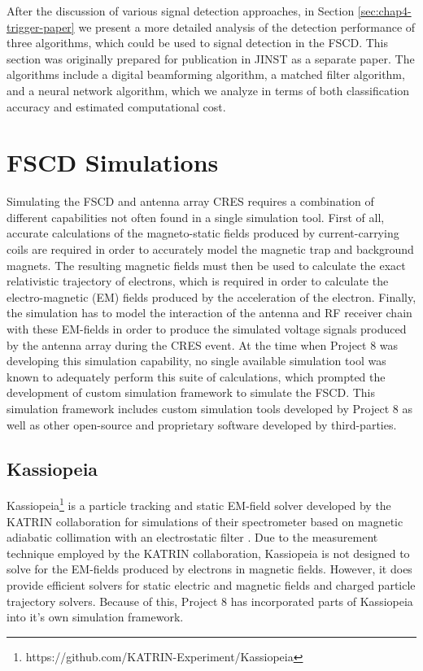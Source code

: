 After the discussion of various signal detection approaches, in Section \ref{sec:chap4-trigger-paper} we present a more detailed analysis of the detection performance of three algorithms, which could be used to signal detection in the FSCD. This section was originally prepared for publication in JINST as a separate paper. The algorithms include a digital beamforming algorithm, a matched filter algorithm, and a neural network algorithm, which we analyze in terms of both classification accuracy and estimated computational cost.  

\section{FSCD Simulations}
\label{sec:chap4-simulations}

Simulating the FSCD and antenna array CRES requires a combination of different capabilities not often found in a single simulation tool. First of all, accurate calculations of the magneto-static fields produced by current-carrying coils are required in order to accurately model the magnetic trap and background magnets. The resulting magnetic fields must then be used to calculate the exact relativistic trajectory of electrons, which is required in order to calculate the electro-magnetic (EM) fields produced by the acceleration of the electron. Finally, the simulation has to model the interaction of the antenna and RF receiver chain with these EM-fields in order to produce the simulated voltage signals produced by the antenna array during the CRES event. At the time when Project 8 was developing this simulation capability, no single available simulation tool was known to adequately perform this suite of calculations, which prompted the development of custom simulation framework to simulate the FSCD. This simulation framework includes custom simulation tools developed by Project 8 as well as other open-source and proprietary software developed by third-parties.

\subsection{Kassiopeia}

Kassiopeia\footnote{https://github.com/KATRIN-Experiment/Kassiopeia} is a particle tracking and static EM-field solver developed by the KATRIN collaboration for simulations of their spectrometer based on magnetic adiabatic collimation with an electrostatic filter \cite{kassiopeia}. Due to the measurement technique employed by the KATRIN collaboration, Kassiopeia is not designed to solve for the EM-fields produced by electrons in magnetic fields. However, it does provide efficient solvers for static electric and magnetic fields and charged particle trajectory solvers. Because of this, Project 8 has incorporated parts of Kassiopeia into it's own simulation framework. 

